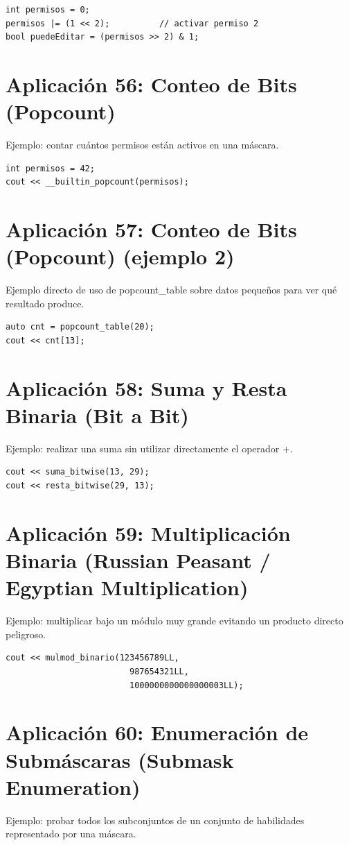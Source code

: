 \documentclass[10pt,twocolumn,letterpaper]{report}
\begin{document}
\begin{lstlisting}
int permisos = 0;
permisos |= (1 << 2);          // activar permiso 2
bool puedeEditar = (permisos >> 2) & 1;
\end{lstlisting}

\section{Aplicación 56: Conteo de Bits (Popcount)}
Ejemplo: contar cuántos permisos están activos en una máscara.

\begin{lstlisting}
int permisos = 42;
cout << __builtin_popcount(permisos);
\end{lstlisting}

\section{Aplicación 57: Conteo de Bits (Popcount) (ejemplo 2)}
Ejemplo directo de uso de popcount\_table sobre datos pequeños para ver qué resultado produce.

\begin{lstlisting}
auto cnt = popcount_table(20);
cout << cnt[13];
\end{lstlisting}

\section{Aplicación 58: Suma y Resta Binaria (Bit a Bit)}
Ejemplo: realizar una suma sin utilizar directamente el operador +.

\begin{lstlisting}
cout << suma_bitwise(13, 29);
cout << resta_bitwise(29, 13);
\end{lstlisting}

\section{Aplicación 59: Multiplicación Binaria (Russian Peasant / Egyptian Multiplication)}
Ejemplo: multiplicar bajo un módulo muy grande evitando un producto directo peligroso.

\begin{lstlisting}
cout << mulmod_binario(123456789LL,
                         987654321LL,
                         1000000000000000003LL);
\end{lstlisting}

\section{Aplicación 60: Enumeración de Submáscaras (Submask Enumeration)}
Ejemplo: probar todos los subconjuntos de un conjunto de habilidades representado por una máscara.
\end{document}
